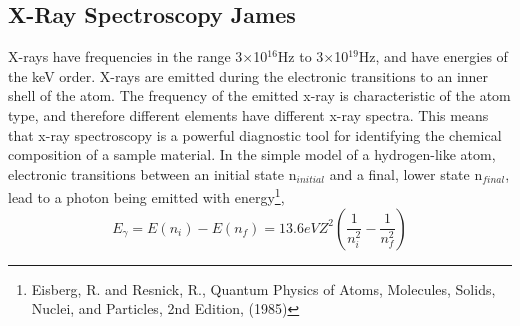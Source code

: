 \documentclass[a4paper ,12pt]{article}
\begin{document}
\subsection{X-Ray Spectroscopy James}
X-rays have frequencies in the range 3$\times$10$^{16}$Hz to 3$\times$10$^{19}$Hz, and have energies of the keV order. X-rays are emitted during the electronic transitions to an inner shell of the atom. The frequency of the emitted x-ray is characteristic of the atom type, and therefore different elements have different x-ray spectra. This means that x-ray spectroscopy is a powerful diagnostic tool for identifying the chemical composition of a sample material.
In the simple model of a hydrogen-like atom, electronic transitions between an initial state n$_{initial}$ and a final, lower state n$_{final}$, lead to a photon being emitted with energy\footnote{Eisberg, R. and Resnick, R., Quantum Physics of Atoms, Molecules, Solids, Nuclei, and Particles, 2nd Edition, (1985)},\\\begin{displaymath} E_{\gamma} = E(n_{i})-E(n_{f}) =13.6eVZ^2\left(\frac{1}{n^2_i}-\frac{1}{n^2_f}\right) \end{displaymath}
\end{document}
